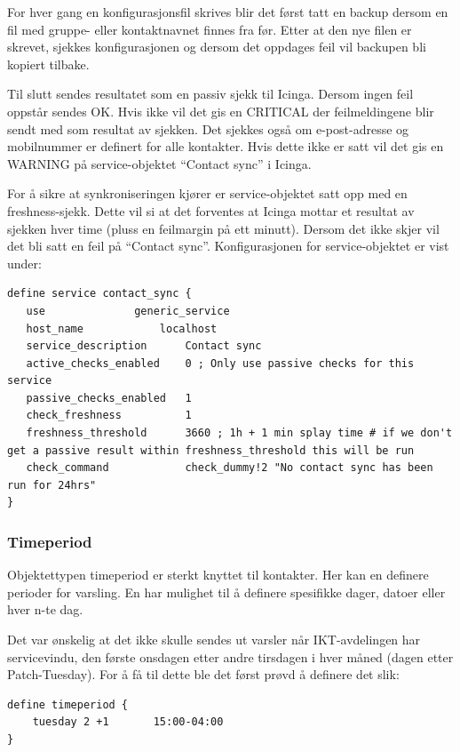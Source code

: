 For hver gang en konfigurasjonsfil skrives blir det først tatt en backup dersom en fil med gruppe- eller kontaktnavnet finnes fra før. Etter at den nye filen er skrevet, sjekkes konfigurasjonen og dersom det oppdages feil vil backupen bli kopiert tilbake. 

Til slutt sendes resultatet som en passiv sjekk til Icinga. Dersom ingen feil oppstår sendes OK. Hvis ikke vil det gis en CRITICAL der feilmeldingene blir sendt med som resultat av sjekken. Det sjekkes også om e-post-adresse og mobilnummer er definert for alle kontakter. Hvis dette ikke er satt vil det gis en WARNING på service-objektet ``Contact sync'' i Icinga.

For å sikre at synkroniseringen kjører er service-objektet satt opp med en freshness-sjekk. Dette vil si at det forventes at Icinga mottar et resultat av sjekken hver time (pluss en feilmargin på ett minutt). Dersom det ikke skjer vil det bli satt en feil på ``Contact sync''. Konfigurasjonen for service-objektet er vist under:
\begin{lstlisting}[style=example]
define service contact_sync {
   use 				generic_service
   host_name      		localhost
   service_description  	Contact sync
   active_checks_enabled   	0 ; Only use passive checks for this service
   passive_checks_enabled  	1
   check_freshness      	1
   freshness_threshold     	3660 ; 1h + 1 min splay time # if we don't get a passive result within freshness_threshold this will be run
   check_command     		check_dummy!2 "No contact sync has been run for 24hrs" 
}
\end{lstlisting}

\subsubsection{Timeperiod}

Objektettypen timeperiod er sterkt knyttet til kontakter. Her kan en definere perioder for varsling. En har mulighet til å definere spesifikke dager, datoer eller hver n-te dag. 

Det var ønskelig at det ikke skulle sendes ut varsler når IKT-avdelingen har servicevindu, den første onsdagen etter andre tirsdagen i hver måned (dagen etter Patch-Tuesday\cite{wiki:patch}). For å få til dette ble det først prøvd å definere det slik:

\begin{lstlisting}[style=example]
define timeperiod {
    tuesday 2 +1       15:00-04:00
}
\end{lstlisting}

